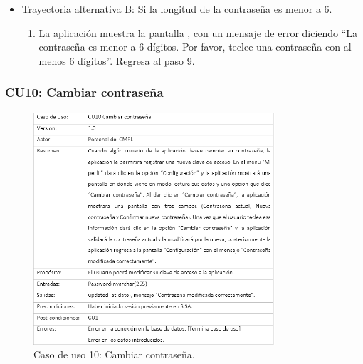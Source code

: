 \begin{itemize}
\begin{itemize}
\begin{enumerate}
							\end{enumerate}
						\item Trayectoria alternativa B: Si la longitud de la contraseña es menor a 6.
							\begin{enumerate}
								\item La aplicación muestra la pantalla , con un mensaje de error diciendo ``La contraseña es menor a 6 dígitos. Por favor, teclee una contraseña con al menos 6 dígitos''. Regresa al paso 9.
							\end{enumerate}
					\end{itemize}
			\end{itemize}
			
		\subsubsection{CU10: Cambiar contraseña}
			\begin{figure}[htbp!]
				\centering
					\includegraphics[width=0.8\textwidth]{images/CU/CU10}
					\caption{Caso de uso 10: Cambiar contraseña.}
				\label{Tabla}
			\end{figure}
			
